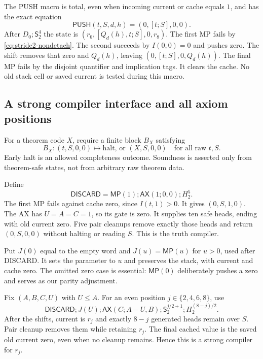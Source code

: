 The PUSH macro is total, even when incoming current or cache equals $1$,
and has the exact equation
\begin{equation}
 \mathsf{PUSH}(t,S,d,h)=(0,[t;S],0,0).
 \label{eq:stride2-push}
\end{equation}
After $D_0;\mathsf S_2^4$ the state is
$(r_6,[Q_d(h),t;S],0,r_8)$. The first MP fails by
\eqref{eq:stride2-nondetach}. The second succeeds by $I(0,0)=0$ and
pushes zero. The shift removes that zero and $Q_d(h)$, leaving
$(0,[t;S],0,Q_d(h))$. The final MP fails by the disjoint quantifier and
implication tags. It clears the cache. No old stack cell or saved current
is tested during this macro.

\subsection{A strong compiler interface and all axiom positions}

For a theorem code $X$, require a finite block $B_X$ satisfying
\begin{equation}
 B_X:(t,S,0,0)\longmapsto
       \text{halt, or }(X,S,0,0)
 \quad\text{for all raw }t,S.
 \label{eq:stride2-strong}
\end{equation}
Early halt is an allowed completeness outcome. Soundness is asserted only
from theorem-safe states, not from arbitrary raw theorem data.

Define
\[
 \mathsf{DISCARD}=\mathsf{MP}(1);\mathsf{AX}(1;0,0);H_2^5.
\]
The first MP fails against cache zero, since $I(t,1)>0$. It gives
$(0,S,1,0)$. The AX has $U=A=C=1$, so its gate is zero. It supplies ten
safe heads, ending with old current zero. Five pair cleanups remove
exactly those heads and return $(0,S,0,0)$ without halting or reading $S$.
This is the truth compiler.

Put $J(0)$ equal to the empty word and $J(u)=\mathsf{MP}(u)$ for $u>0$,
used after DISCARD. It sets the parameter to $u$ and preserves the stack,
with current and cache zero. The omitted zero case is essential:
$\mathsf{MP}(0)$ deliberately pushes a zero and serves as our parity
adjustment.

Fix $(A,B,C,U)$ with $U\leq A$. For an even position
$j\in\{2,4,6,8\}$, use
\begin{equation}
 \mathsf{DISCARD};J(U);\mathsf{AX}(C;A-U,B);
       \mathsf S_2^{j/2+1};H_2^{(8-j)/2}.
 \label{eq:stride2-even}
\end{equation}
After the shifts, current is $r_j$ and exactly $8-j$ generated heads
remain over $S$. Pair cleanup removes them while retaining $r_j$. The
final cached value is the saved old current zero, even when no cleanup
remains. Hence this is a strong compiler for $r_j$.

